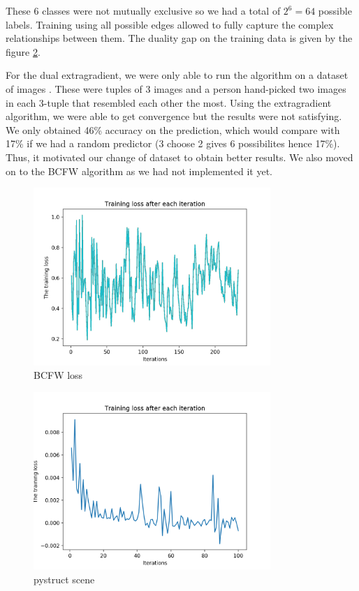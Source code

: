 These 6 classes were not mutually exclusive so we had a total of $2^6=64$
possible labels. Training using all possible edges allowed to fully capture the
complex relationships between them. The duality gap on the training data is
given by the figure \ref{fig:bcfwLoss}.

For the dual extragradient, we were only able to run the algorithm on a dataset
of images \citet{vemulapalliCompactEmbeddingFacial2018}. These were tuples of 3 images and a person
hand-picked two images in each 3-tuple that resembled each other the most. Using the
extragradient algorithm, we were able to get convergence but the results were not 
satisfying. We only obtained 46\% accuracy on the prediction, which would compare 
with 17\% if we had a random predictor (3 choose 2 gives 6 possibilites hence 17\%).
Thus, it motivated our change of dataset to obtain better results. We also moved on to
the BCFW algorithm as we had not implemented it yet.

\begin{figure}[htbp!]
  \center
  \includegraphics[width=0.8\textwidth]{loss_bcfw.png}
  \caption{BCFW loss}
  \label{fig:bcfwLoss}
\end{figure} 
\begin{figure}[htbp!]
  \center
  \includegraphics[width=0.8\textwidth]{pystruct_scene.png}
  \caption{pystruct scene}
  \label{fig:bcfwLoss}
\end{figure} 


